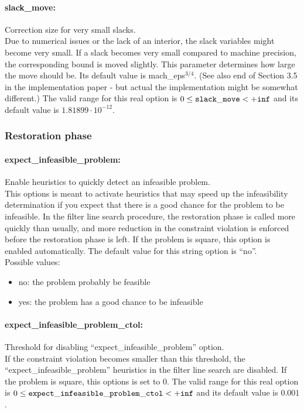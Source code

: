 \paragraph{slack\_move:} Correction size for very small slacks. $\;$ \\
 Due to numerical issues or the lack of an
interior, the slack variables might become very
small.  If a slack becomes very small compared to
machine precision, the corresponding bound is
moved slightly.  This parameter determines how
large the move should be.  Its default value is
mach\_eps$^{3/4}$.  (See also end of Section 3.5
in the implementation paper - but actual
the implementation might be somewhat different.) The valid range for this real option is 
$0 \le {\tt slack\_move } <  {\tt +inf}$
and its default value is $1.81899 \cdot 10^{-12}$.

\subsubsection{Restoration phase}

\paragraph{expect\_infeasible\_problem:} Enable heuristics to quickly detect an infeasible problem. $\;$ \\
 This options is meant to activate heuristics that
may speed up the infeasibility determination if
you expect that there is a good chance for the
problem to be infeasible.  In the filter line
search procedure, the restoration phase is called
more quickly than usually, and more reduction in
the constraint violation is enforced before the
restoration phase is left. If the problem is
square, this option is enabled automatically.
The default value for this string option is ``no''.
\\ 
Possible values:
\begin{itemize}
   \item no: the problem probably be feasible
   \item yes: the problem has a good chance to be infeasible
\end{itemize}

\paragraph{expect\_infeasible\_problem\_ctol:} Threshold for disabling ``expect\_infeasible\_problem'' option. $\;$ \\
 If the constraint violation becomes smaller than
this threshold, the ``expect\_infeasible\_problem''
heuristics in the filter line search are
disabled. If the problem is square, this options
is set to 0. The valid range for this real option is 
$0 \le {\tt expect\_infeasible\_problem\_ctol } <  {\tt +inf}$
and its default value is $0.001$.


